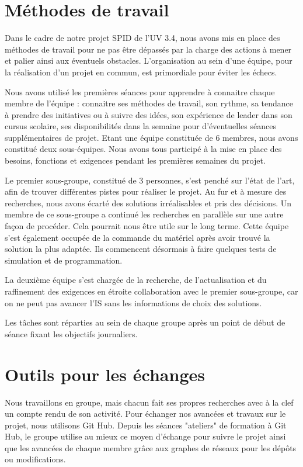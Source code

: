 
\chapter{Méthodes de travail}

Dans le cadre de notre projet SPID de l’UV 3.4, nous avons mis en place des méthodes de travail pour ne pas être dépassés par la charge des actions à mener et palier ainsi aux éventuels obstacles.  
L’organisation au sein d’une équipe, pour la réalisation d’un projet en commun, est primordiale pour éviter les échecs.

Nous avons utilisé les premières séances pour apprendre à connaitre chaque membre de l’équipe : connaitre ses méthodes de travail, son rythme, sa tendance à prendre des initiatives ou à suivre des idées, son expérience de leader dans son cursus scolaire, ses disponibilités dans la semaine pour d’éventuelles séances supplémentaires de projet. 
Etant une équipe constituée de 6 membres, nous avons constitué deux sous-équipes. Nous avons tous participé à la mise en place des besoins, fonctions et exigences pendant les premières semaines du projet. 

Le premier sous-groupe, constitué de 3 personnes, s’est penché sur l’état de l’art, afin de trouver différentes pistes pour réaliser le projet. Au fur et à mesure des recherches, nous avons écarté des solutions irréalisables et pris des décisions. Un membre de ce sous-groupe a continué les recherches en parallèle sur une autre façon de procéder. Cela pourrait nous être utile sur le long terme. 
Cette équipe s’est également occupée de la commande du matériel après avoir trouvé la solution la plus adaptée. Ils commencent désormais à faire quelques tests de simulation et de programmation.

La deuxième équipe s'est chargée de la recherche, de l'actualisation et du raffinement des exigences en étroite collaboration avec le premier sous-groupe, car on ne peut pas avancer l’IS sans les informations de choix des solutions. 

Les tâches sont réparties au sein de chaque groupe après un point de début de séance fixant les objectifs journaliers.

\chapter{Outils pour les échanges}

Nous travaillons en groupe, mais chacun fait ses propres recherches avec à la clef un compte rendu de son activité. Pour échanger nos avancées et travaux sur le projet, nous utilisons Git Hub. Depuis les séances "ateliers" de formation à Git Hub, le groupe utilise au mieux ce moyen d'échange pour suivre le projet ainsi que les avancées de chaque membre grâce aux graphes de réseaux pour les dépôts ou modifications. 

